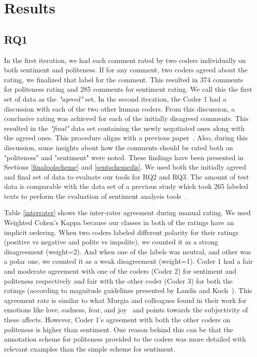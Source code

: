  
\section{Results}

\subsection{RQ1 }\label{gt}

In the first iteration, 
we had each comment rated by two coders individually 
on both sentiment and politeness. 
If for any comment, 
two coders agreed about the rating, 
we finalized that label for the comment. 
This resulted in 374 comments for politeness rating 
and 285 comments for sentiment rating. 
We call this the first set of data as the \textit{"agreed"} set.
In the second iteration, 
the Coder 1 had a discussion 
with each of the two other human coders. 
From this discussion, 
a conclusive rating was achieved 
for each of the initially disagreed comments. 
This resulted in the \textit{"final" }data set 
containing the newly negotiated ones along with the agreed ones. 
This procedure aligns with a previous paper~\cite{ahmed2017senticr}. Also, during this discussion, 
some insights about how the comments should be rated 
both on "politeness" and "sentiment" were noted. 
These findings have been presented in Sections \ref{finalpolscheme} and \ref{sentschemedis}.
We used both the initially agreed and final set of data 
to evaluate our tools for RQ2 and RQ3. 
The amount of test data is comparable 
with the data set of a previous study 
which took 265 labeled texts to 
perform the evaluation of sentiment analysis tools~\cite{jongeling2017negative}.

Table \ref{interrater} shows the inter-rater agreement
during manual rating. 
We used Weighted Cohen's Kappa 
because our classes in both of the ratings 
have an implicit ordering. 
When two coders labeled different polarity 
for their ratings 
(positive vs negative and polite vs impolite), 
we counted it as a strong disagreement (weight=2). 
And when one of the labels was neutral, 
and other was a polar one, 
we counted it as a weak disagreement (weight=1).
Coder 1 had a fair and moderate agreement 
with one of the coders (Coder 2) 
for sentiment and politeness respectively and 
fair with the other coder (Coder 3) for both the ratings 
(according to magnitude guidelines presented by Landis and Koch~\cite{landis1977measurement}). 
This agreement rate is similar to what 
Murgia and colleagues found in their work 
for emotions like love, sadness, fear, and joy~\cite{murgia2014developers} and 
points towards the subjectivity of these affects.
However, 
Coder 1's agreement with both the other coders
on politeness 
is higher than sentiment. 
One reason behind this can be 
that the annotation scheme for politeness 
provided to the coders 
was more detailed with relevant examples 
than the simple scheme for sentiment. 

